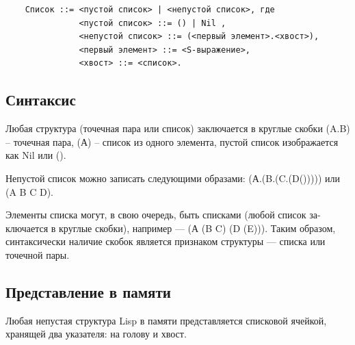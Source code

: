 \documentclass[a4paper,14pt, unknownkeysallowed]{extreport}
\begin{document}
\begin{center}
\captionsetup{justification=raggedright,singlelinecheck=off}
\begin{lstlisting}
	Список ::= <пустой список> | <непустой список>, где 
			   <пустой список> ::= () | Nil ,
			   <непустой список> ::= (<первый элемент>.<хвост>), 
			   <первый элемент> ::= <S-выражение>,
			   <хвост> ::= <список>.
\end{lstlisting}
\end{center}	

\subsection{Синтаксис}

Любая структура (точечная пара или список) заключается в круглые
скобки (A.B) -- точечная пара, (А) -- список из одного элемента, пустой список изображается как Nil или ().

Непустой список можно записать следующими образами: (А.(B.(C.(D())))) или (A B C D).

Элементы списка могут, в свою очередь, быть списками (любой список за- ключается в круглые скобки), например — (А (B C) (D (E))). Таким образом, синтаксически наличие скобок является признаком структуры — списка или точечной пары.

\subsection{Представление в памяти}

Любая непустая структура Lisp в памяти представляется списковой ячейкой, хранящей два указателя: на голову и хвост.

\clearpage
\end{document}
